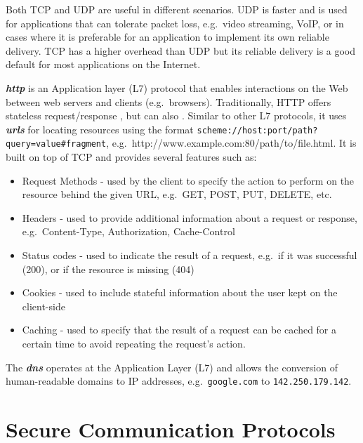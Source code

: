 Both TCP and UDP are useful in different scenarios. UDP is faster and is
used for applications that can tolerate packet loss, e.g.~video
streaming, VoIP, or in cases where it is preferable for an application
to implement its own reliable delivery. TCP has a higher overhead than
UDP but its reliable delivery is a good default for most applications on
the Internet.


\textbf{\emph{\gls{http}}} is an Application layer (L7) protocol that
enables interactions on the Web between web servers and clients
(e.g.~browsers). Traditionally, HTTP offers stateless request/response ,
but can also . Similar to other L7 protocols, it uses
\textbf{\emph{\glspl{url}}} for locating resources using the format
\texttt{scheme://host:port/path?query=value\#fragment},
e.g.~http://www.example.com:80/path/to/file.html. It is built on top of
TCP and provides several features such as:

\begin{itemize}
\tightlist
\item
  Request Methods - used by the client to specify the action to perform
  on the resource behind the given URL, e.g.~GET, POST, PUT, DELETE,
  etc.
\item
  Headers - used to provide additional information about a request or
  response, e.g.~Content-Type, Authorization, Cache-Control
\item
  Status codes - used to indicate the result of a request, e.g.~if it
  was successful (200), or if the resource is missing (404)
\item
  Cookies - used to include stateful information about the user kept on
  the client-side
\item
  Caching - used to specify that the result of a request can be cached
  for a certain time to avoid repeating the request's action.
\end{itemize}

The \textbf{\emph{\gls{dns}}} operates at the Application Layer (L7) and
allows the conversion of human-readable domains to IP addresses,
e.g.~\texttt{google.com} to \texttt{142.250.179.142}.

\hypertarget{secure-communication-protocols}{%
\section{Secure Communication
Protocols}\label{secure-communication-protocols}}

